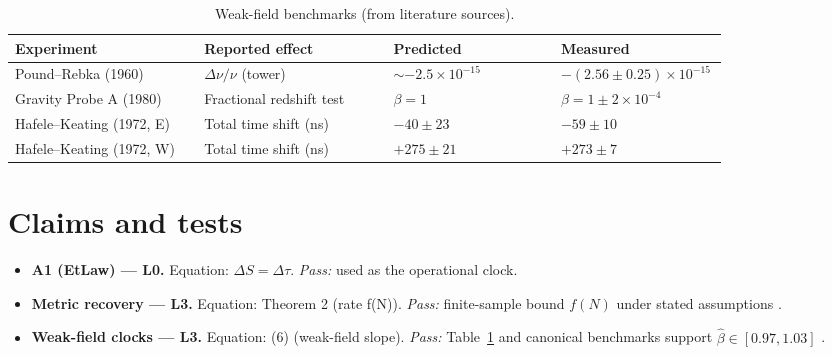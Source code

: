 \begin{table}[t]
\centering
\footnotesize
\setlength{\tabcolsep}{4pt}        %
\renewcommand{\arraystretch}{1.1}  %
\caption{Weak-field benchmarks (from literature sources).}
\label{tab:weakfield-benchmarks}
\begin{tabular}{@{}p{0.26\linewidth}p{0.26\linewidth}p{0.23\linewidth}p{0.23\linewidth}@{}}
\hline
\textbf{Experiment} &
\textbf{Reported effect} &
\textbf{Predicted} &
\textbf{Measured} \\
\hline
\parbox[t]{\linewidth}{\raggedright Pound--Rebka (1960)} &
\parbox[t]{\linewidth}{\raggedright $\Delta\nu/\nu$ (tower)} &
\parbox[t]{\linewidth}{\raggedright $\sim -2.5\times10^{-15}$} &
\parbox[t]{\linewidth}{\raggedright $-(2.56\pm0.25)\times10^{-15}$ \cite{poundrebka1960}} \\
%
\parbox[t]{\linewidth}{\raggedright Gravity Probe A (1980)} &
\parbox[t]{\linewidth}{\raggedright Fractional redshift test} &
\parbox[t]{\linewidth}{\raggedright $\beta=1$} &
\parbox[t]{\linewidth}{\raggedright $\beta=1\pm2\times10^{-4}$ \cite{vessot1980}} \\
%
\parbox[t]{\linewidth}{\raggedright Hafele--Keating (1972, E)} &
\parbox[t]{\linewidth}{\raggedright Total time shift (ns)} &
\parbox[t]{\linewidth}{\raggedright $-40\pm23$} &
\parbox[t]{\linewidth}{\raggedright $-59\pm10$ \cite{hafelekeating1972}} \\
%
\parbox[t]{\linewidth}{\raggedright Hafele--Keating (1972, W)} &
\parbox[t]{\linewidth}{\raggedright Total time shift (ns)} &
\parbox[t]{\linewidth}{\raggedright $+275\pm21$} &
\parbox[t]{\linewidth}{\raggedright $+273\pm7$ \cite{hafelekeating1972}} \\
\hline
\end{tabular}
\end{table}
\clearpage


\section*{Claims and tests}
\begin{itemize}
  \item \textbf{A1 (EtLaw) — L0.} Equation: $\Delta S=\Delta\tau$. \emph{Pass:} used as the operational clock.
  \item \textbf{Metric recovery — L3.} Equation: Theorem 2 (rate f(N)). \emph{Pass:} finite-sample bound $f(N)$ under stated assumptions \cite{penrose2003}.
  \item \textbf{Weak-field clocks — L3.} Equation: (6) (weak-field slope). \emph{Pass:} Table~\ref{tab:weakfield-benchmarks} and canonical benchmarks support $\hat\beta\in[0.97,1.03]$ \cite{poundrebka1960,vessot1980,hafelekeating1972}.
\end{itemize}

